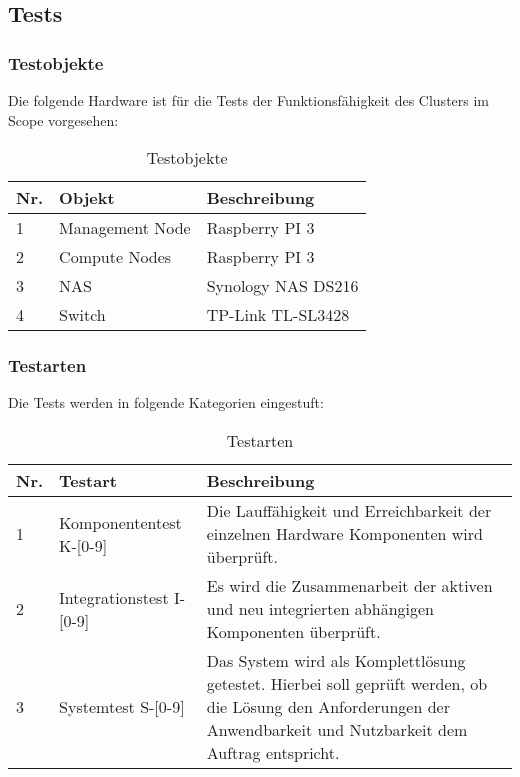 \subsection{Tests}
\subsubsection{Testobjekte}
Die folgende Hardware ist für die Tests der Funktionsfähigkeit des Clusters im Scope vorgesehen:
\begin{table}[H]
\centering
\begin{tabular}{p{1cm}p{}p{7.5cm}}
\hline
\rowcolor{heading} \textbf{Nr.} & \textbf{Objekt} & \textbf{Beschreibung} \\\hline
1 & Management Node & Raspberry PI 3  \\\hline
2 & Compute Nodes & Raspberry PI 3 \\\hline
3 & NAS & Synology NAS DS216 \\\hline
4 & Switch & TP-Link TL-SL3428 \\\hline
\end{tabular}
\caption{Testobjekte}
\end{table}

\subsubsection{Testarten}
Die Tests werden in folgende Kategorien eingestuft:

\begin{table}[H]
\centering
\begin{tabular}{p{1cm}p{3cm}p{12cm}}
\hline
\rowcolor{heading} \textbf{Nr.} & \textbf{Testart} & \textbf{Beschreibung} \\\hline
1 & Komponententest \newline K-[0-9]& Die Lauffähigkeit und Erreichbarkeit der einzelnen Hardware Komponenten wird überprüft.  \\\hline
2 & Integrationstest \newline I-[0-9] & Es wird die Zusammenarbeit der aktiven und neu integrierten abhängigen Komponenten überprüft. \\\hline
3 & Systemtest \newline S-[0-9] & Das System wird als Komplettlösung getestet. Hierbei soll geprüft werden, ob die Lösung den Anforderungen der Anwendbarkeit und Nutzbarkeit dem Auftrag entspricht.  \\\hline
\end{tabular}
\caption{Testarten}
\end{table}

